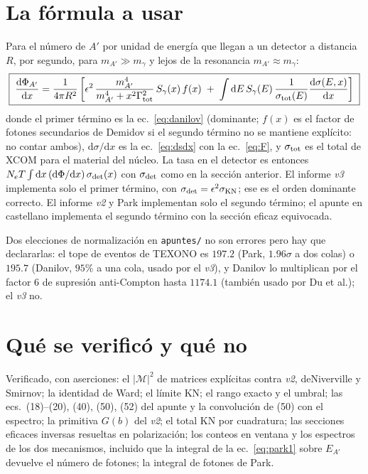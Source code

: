 \documentclass[11pt,a4paper]{article}
\newcommand{\Ap}{A'}
\newcommand{\eps}{\epsilon}
\newcommand{\KN}{\mathrm{KN}}
\newcommand{\dd}{\mathrm{d}}
\begin{document}
\section{La fórmula a usar}
Para el número de $\Ap$ por unidad de energía que llegan a un detector a distancia $R$, por segundo, para
$m_{\Ap}\gg m_\gamma$ y lejos de la resonancia $m_{\Ap}\approx m_\gamma$:
\begin{equation}
\boxed{\;
\frac{\dd\Phi_{\Ap}}{\dd x}=\frac{1}{4\pi R^2}\left[\eps^2\,\frac{m_{\Ap}^4}{m_{\Ap}^4+x^2\Gamma_{\rm tot}^2}\,S_\gamma(x)\,f(x)
\;+\;\int\dd E\,S_\gamma(E)\,\frac{1}{\sigma_{\rm tot}(E)}\frac{\dd\sigma(E,x)}{\dd x}\right]
\;}
\label{eq:final}
\end{equation}
donde el primer término es la ec.~\eqref{eq:danilov} (dominante; $f(x)$ es el factor de fotones secundarios de Demidov si
el segundo término no se mantiene explícito: no contar ambos), $\dd\sigma/\dd x$ es la ec.~\eqref{eq:dsdx} con la
ec.~\eqref{eq:F}, y $\sigma_{\rm tot}$ es el total de XCOM para el material del núcleo. La tasa en el detector es entonces
$N_e T\int\dd x\,(\dd\Phi/\dd x)\,\sigma_{\rm det}(x)$ con $\sigma_{\rm det}$ como en la sección anterior. El informe
\emph{v3} implementa solo el primer término, con $\sigma_{\rm det}=\eps^2\sigma_\KN$; ese es el orden dominante correcto.
El informe \emph{v2} y Park implementan solo el segundo término; el apunte en castellano implementa el segundo
término con la sección eficaz equivocada.

Dos elecciones de normalización en \texttt{apuntes/} no son errores pero hay que declararlas: el tope de eventos de
TEXONO es $197.2$ (Park, $1.96\sigma$ a dos colas) o $195.7$ (Danilov, $95\%$ a una cola, usado por el \emph{v3}), y
Danilov lo multiplican por el factor 6 de supresión anti-Compton hasta $1174.1$ (también usado por Du et al.); el
\emph{v3} no.

\section{Qué se verificó y qué no}
\label{sec:receipt}
Verificado, con aserciones: el $|\mathcal M|^2$ de matrices explícitas contra \emph{v2}, deNiverville y Smirnov; la
identidad de Ward; el límite KN; el rango exacto y el umbral; las ecs.~(18)--(20), (40), (50), (52) del apunte y la convolución de (50) con el espectro; la primitiva
$G(b)$ del \emph{v2}; el total KN por cuadratura; las secciones eficaces inversas resueltas en polarización; los conteos
en ventana y los espectros de los dos mecanismos, incluido que la integral de la ec.~\eqref{eq:park1} sobre $E_{\Ap}$
devuelve el número de fotones; la integral de fotones de Park.
\end{document}
